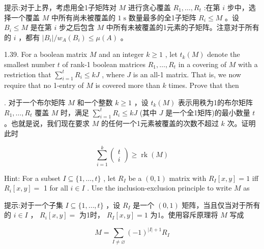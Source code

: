 \documentclass[10pt]{article}
\begin{document}
\begin{tcolorbox}\relax
提示:对于上界，考虑用全1子矩阵对 \(M\) 进行贪心覆盖 \({R}_{1},\ldots ,{R}_{t}\) :在第 \(i\) 步中，选择一个覆盖 \(M\) 中所有尚未被覆盖的 \(1\mathrm{\;s}\) 数量最多的全1子矩阵 \({R}_{i} \leq  M\) 。设 \({B}_{i} \leq  M\) 是在第 \(i\) 步之后包含 \(M\) 中所有未被覆盖的1元素的子矩阵。注意对于所有的 \(i\) ，都有 \(\left| {B}_{i}\right| /{w}_{A}\left( {B}_{i}\right)  \leq  \mu \left( A\right)\) 。
\end{tcolorbox}

1.39. For a boolean matrix \(M\) and an integer \(k \geq  1\) , let \({t}_{k}\left( M\right)\) denote the smallest number \(t\) of rank-1 boolean matrices \({R}_{1},\ldots ,{R}_{t}\) in a covering of \(M\) with a restriction that \(\mathop{\sum }\limits_{{i = 1}}^{t}{R}_{i} \leq  {kJ}\) , where \(J\) is an all-1 matrix. That is, we now require that no 1-entry of \(M\) is covered more than \(k\) times. Prove that then

\begin{tcolorbox}. 对于一个布尔矩阵 \(M\) 和一个整数 \(k \geq  1\) ，设 \({t}_{k}\left( M\right)\) 表示用秩为1的布尔矩阵 \({R}_{1},\ldots ,{R}_{t}\) 覆盖 \(M\) 时，满足 \(\mathop{\sum }\limits_{{i = 1}}^{t}{R}_{i} \leq  {kJ}\) (其中 \(J\) 是一个全1矩阵)的最小数量 \(t\) 。也就是说，我们现在要求 \(M\) 的任何一个1元素被覆盖的次数不超过 \(k\) 次。证明此时
\end{tcolorbox}

\[
\mathop{\sum }\limits_{{i = 1}}^{k}\left( \begin{array}{l} t \\  i \end{array}\right)  \geq  \operatorname{rk}\left( M\right)
\]

Hint: For a subset \(I \subseteq  \{ 1,\ldots ,t\}\) , let \({R}_{I}\) be a \(\left( {0,1}\right)\) matrix with \({R}_{I}\left\lbrack  {x,y}\right\rbrack   = 1\) iff \({R}_{i}\left\lbrack  {x,y}\right\rbrack   =\) 1 for all \(i \in  I\) . Use the inclusion-exclusion principle to write \(M\) as

\begin{tcolorbox}\relax
提示:对于一个子集 \(I \subseteq  \{ 1,\ldots ,t\}\) ，设 \({R}_{I}\) 是一个 \(\left( {0,1}\right)\) 矩阵，当且仅当对于所有的 \(i \in  I\) ， \({R}_{i}\left\lbrack  {x,y}\right\rbrack   =\) 为1时， \({R}_{I}\left\lbrack  {x,y}\right\rbrack   = 1\) 为1。使用容斥原理将 \(M\) 写成
\end{tcolorbox}

\[
M = \mathop{\sum }\limits_{{I \neq  \varnothing }}{\left( -1\right) }^{\left| I\right|  + 1}{R}_{I}
\]
\end{document}
